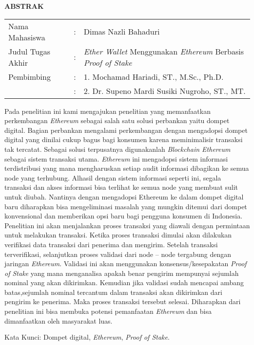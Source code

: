\begin{center}
  \large\textbf{ABSTRAK}
\end{center}


\vspace{2ex}

\begingroup
  \setlength{\tabcolsep}{0pt}

  \noindent
  \begin{tabularx}{\textwidth}{l >{\centering}m{2em} X}
    Nama Mahasiswa    &:& Dimas Nazli Bahaduri \\

    Judul Tugas Akhir &:&	\emph{Ether Wallet} Menggunakan \emph{Ethereum} Berbasis \emph{Proof of Stake} \\

    Pembimbing        &:& 1. Mochamad Hariadi, ST., M.Sc., Ph.D. \\
  &:& 2. Dr. Supeno Mardi Susiki Nugroho, ST., MT.
  \end{tabularx}
\endgroup

Pada penelitian ini kami mengajukan penelitian yang memanfaatkan perkembangan \emph{Ethereum} sebagai salah satu solusi perbankan yaitu dompet digital. Bagian perbankan mengalami perkembangan dengan mengadopsi dompet digital yang dinilai cukup bagus bagi konsumen karena meminimalisir transaksi tak tercatat. Sebagai solusi terpusatnya digunakanlah \emph{Blockchain Ethereum} sebagai sistem transaksi utama. \emph{Ethereum} ini mengadopsi sistem informasi terdistribusi yang mana mengharuskan setiap audit informasi dibagikan ke semua node yang terhubung. Alhasil dengan sistem informasi seperti ini, segala transaksi dan akses informasi bisa terlihat ke semua node yang membuat sulit untuk diubah. Nantinya dengan mengadopsi Ethereum ke dalam dompet digital baru diharapkan bisa mengeliminasi masalah yang mungkin ditemui dari dompet konvensional dan memberikan opsi baru bagi pengguna konsumen di Indonesia. Penelitian ini akan menjalankan proses transaksi yang diawali dengan permintaan untuk melakukan transaksi. Ketika proses transaksi dimulai akan dilakukan verifikasi data transaksi dari penerima dan mengirim. Setelah transaksi terverifikasi, selanjutkan proses validasi dari node – node tergabung dengan jaringan \emph{Ethereum}. Validasi ini akan menggunakan konsensus/kesepakatan \emph{Proof of Stake} yang mana menganalisa apakah benar pengirim mempunyai sejumlah nominal yang akan dikirimkan. Kemudian jika validasi sudah mencapai ambang batas,sejumlah nominal tercantum dalam transaksi akan dikirimkan dari pengirim ke penerima. Maka proses transaksi tersebut selesai. Diharapkan dari penelitian ini bisa membuka potensi pemanfaatan \emph{Ethereum} dan bisa dimanfaatkan oleh masyarakat luas.

Kata Kunci: Dompet digital, \emph{Ethereum}, \emph{Proof of Stake}.
